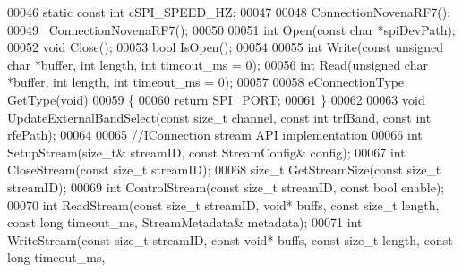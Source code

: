 \begin{DoxyCode}
00046     \textcolor{keyword}{static} \textcolor{keyword}{const} \textcolor{keywordtype}{int} cSPI_SPEED_HZ;
00047 
00048     ConnectionNovenaRF7();
00049     ~ConnectionNovenaRF7();
00050 
00051     \textcolor{keywordtype}{int} Open(\textcolor{keyword}{const} \textcolor{keywordtype}{char} *spiDevPath);
00052     \textcolor{keywordtype}{void} Close();
00053     \textcolor{keywordtype}{bool} IsOpen();
00054 
00055     \textcolor{keywordtype}{int} Write(\textcolor{keyword}{const} \textcolor{keywordtype}{unsigned} \textcolor{keywordtype}{char} *buffer, \textcolor{keywordtype}{int} length, \textcolor{keywordtype}{int} timeout_ms = 0);
00056     \textcolor{keywordtype}{int} Read(\textcolor{keywordtype}{unsigned} \textcolor{keywordtype}{char} *buffer, \textcolor{keywordtype}{int} length, \textcolor{keywordtype}{int} timeout_ms = 0);
00057 
00058     eConnectionType GetType(\textcolor{keywordtype}{void})
00059     \{
00060         \textcolor{keywordflow}{return} SPI_PORT;
00061     \}
00062 
00063     \textcolor{keywordtype}{void} UpdateExternalBandSelect(\textcolor{keyword}{const} \textcolor{keywordtype}{size\_t} channel, \textcolor{keyword}{const} \textcolor{keywordtype}{int} trfBand, \textcolor{keyword}{const} \textcolor{keywordtype}{int} rfePath);
00064 
00065     \textcolor{comment}{//IConnection stream API implementation}
00066     \textcolor{keywordtype}{int} SetupStream(\textcolor{keywordtype}{size\_t}& streamID, \textcolor{keyword}{const} StreamConfig& config);
00067     \textcolor{keywordtype}{int} CloseStream(\textcolor{keyword}{const} \textcolor{keywordtype}{size\_t} streamID);
00068     \textcolor{keywordtype}{size\_t} GetStreamSize(\textcolor{keyword}{const} \textcolor{keywordtype}{size\_t} streamID);
00069     \textcolor{keywordtype}{int} ControlStream(\textcolor{keyword}{const} \textcolor{keywordtype}{size\_t} streamID, \textcolor{keyword}{const} \textcolor{keywordtype}{bool} enable);
00070     \textcolor{keywordtype}{int} ReadStream(\textcolor{keyword}{const} \textcolor{keywordtype}{size\_t} streamID, \textcolor{keywordtype}{void}* buffs, \textcolor{keyword}{const} \textcolor{keywordtype}{size\_t} length, \textcolor{keyword}{const} \textcolor{keywordtype}{long} 
      timeout_ms, StreamMetadata& metadata);
00071     \textcolor{keywordtype}{int} WriteStream(\textcolor{keyword}{const} \textcolor{keywordtype}{size\_t} streamID, \textcolor{keyword}{const} \textcolor{keywordtype}{void}* buffs, \textcolor{keyword}{const} \textcolor{keywordtype}{size\_t} length, \textcolor{keyword}{const} \textcolor{keywordtype}{long} timeout\_ms, \textcolor{keyword}{
}
\end{DoxyCode}
